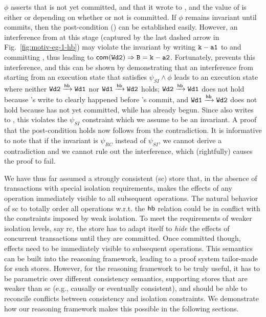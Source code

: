 \noindent $\phi$ asserts that  is not yet committed, and that
it wrote to , and the value of  is either  or
 depending on whether or not  is committed. If $\phi$
remains invariant until  commits, then the post-condition () can be established easily. However, an interference from
 at this stage (captured by the last dashed arrow in
Fig.~\ref{fig:motiv-eg-1-hb}) may violate the invariant by writing
${\tt k-a1}$ to  and committing , thus leading to
$\textsf{com}({\tt Wd2}) \Rightarrow {\tt B=k-a2}$. Fortunately,
 prevents this interference, and this can be
shown by demonstrating that an interference from  starting from
an execution state that satisfies $\psi_{SI} \wedge \phi$ leads to an
execution state where neither ${\tt Wd2} \xrightarrow{\textsf{hb}} {\tt Wd1}$ nor ${\tt Wd1}
\xrightarrow{\textsf{hb}} {\tt Wd2}$ holds; ${\tt Wd2} \xrightarrow{\textsf{hb}} {\tt Wd1}$ does not hold because
's write to  clearly happened before 's commit, and
${\tt Wd1} \xrightarrow{\textsf{hb}} {\tt Wd2}$ does not hold because  has not yet
committed, while  has already begun. Since  also writes
to , this violates the $\psi_{SI}$ constraint which we assume to
be an invariant. A proof that the post-condition holds now follows
from the contradiction. It is informative to note that if the
invariant is $\psi_{RC}$ instead of $\psi_{SI}$, we cannot derive a
contradiction and we cannot rule out the interference, which
(rightfully) causes  the proof to fail.

We have thus far assumed a strongly consistent ({\sc sc}) store that,
in the absence of transactions with special isolation requirements,
makes the effects of any operation immediately visible to all
subsequent operations. The natural behavior of {\sc sc} to totally
order all operations w.r.t. the $\textsf{hb}$ relation could be in conflict
with the constraints imposed by weak isolation. To meet the
requirements of weaker isolation levels, say {\sc rc}, the store has
to adapt itself to \emph{hide} the effects of concurrent transactions
until they are committed. Once committed though, effects need to be
immediately visible to subsequent operations. This semantics can be
built into the reasoning framework, leading to a proof system
tailor-made for such stores. However, for the reasoning framework to
be truly useful, it has to be parametric over different consistency
semantics, supporting stores that are weaker than {\sc sc} (e.g.,
causally or eventually consistent), and should be able to reconcile
conflicts between consistency and isolation constraints.  We
demonstrate how our reasoning framework makes this possible in the
following sections.
